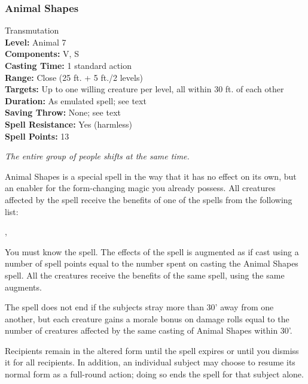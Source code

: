 \subsubsection{Animal Shapes}
\label{Spell:AnimalShapes}
Transmutation
\\ \textbf{Level:} Animal 7
\\ \textbf{Components:} V, S
\\ \textbf{Casting Time:} 1 standard action
\\ \textbf{Range:} Close (25 ft. + 5 ft./2 levels)
\\ \textbf{Targets:} Up to one willing creature per level, all within 30 ft. of each other
\\ \textbf{Duration:} As emulated spell; see text
\\ \textbf{Saving Throw:} None; see text
\\ \textbf{Spell Resistance:} Yes (harmless)
\\ \textbf{Spell Points:} 13

\emph{The entire group of people shifts at the same time.}

Animal Shapes is a special spell in the way that it has no effect on its own, but an enabler for the form-changing magic you already possess. 
All creatures affected by the spell receive the benefits of one of the spells from the following list:
\begin{list}{}{\leftmargin=1em}
 \item {}
 \item {}, 
 \item {}
 \item {}
\end{list}
You must know the spell. The effects of the spell is augmented as if cast using a number of spell points equal to the number spent on casting the Animal Shapes spell. All the creatures receive the benefits of the same spell, using the same augments.

The spell does not end if the subjects stray more than 30' away from one another, but each creature gains a morale bonus on damage rolls equal to the number of creatures affected by the same casting of Animal Shapes within 30'.

Recipients remain in the altered form until the spell expires or until you dismiss it for all recipients. 
In addition, an individual subject may choose to resume its normal form as a full-round action; doing so ends the spell for that subject alone. 
